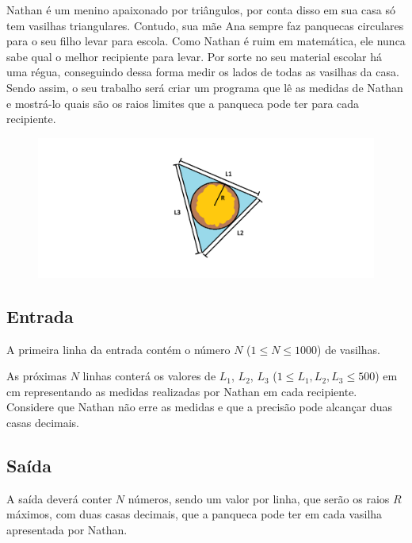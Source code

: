 Nathan é um menino apaixonado por triângulos, por conta disso em sua casa só tem vasilhas triangulares. Contudo, sua mãe Ana sempre faz panquecas circulares para o seu filho levar para escola. Como Nathan é ruim em matemática, ele nunca sabe qual o melhor recipiente para levar. Por sorte no seu material escolar há uma régua, conseguindo dessa forma medir os lados de todas as vasilhas da casa. Sendo assim, o seu trabalho 
será criar um programa que lê as medidas de Nathan e mostrá-lo quais são os raios limites que a panqueca pode ter para cada recipiente. 

\begin{figure}[h!]
	\centering
 \includegraphics[scale=0.5]{vasilhaerrada.png}
\end{figure}

\subsection*{Entrada}
 
A primeira linha da entrada contém o número $N$ ($1\leq N\leq 1000$) de vasilhas.
 
As próximas $N$ linhas conterá os valores de $L_1$, $L_2$, $L_3$ ($1\leq L_1, L_2, L_3 \leq 500$) em cm representando as medidas realizadas por Nathan em cada recipiente. Considere que Nathan não erre as medidas e que a precisão pode alcançar duas casas decimais.
 
\subsection*{Saída}
A saída deverá conter $N$ números, sendo um valor por linha, que serão os raios $R$ máximos, com duas casas decimais, que a panqueca pode ter em cada vasilha apresentada por Nathan.

